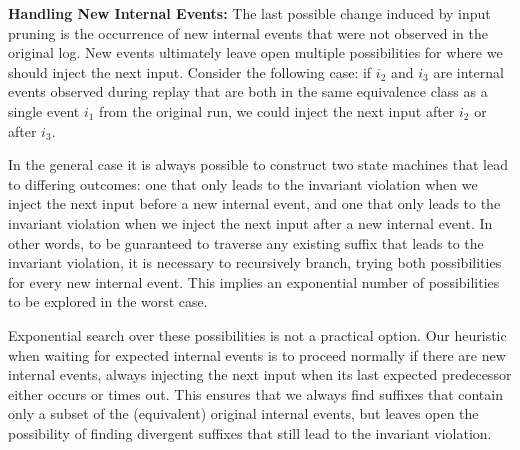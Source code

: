 {\bf Handling New Internal Events:}
The last possible change induced by input pruning is the occurrence of new
internal events that were not observed in the original log.
New events ultimately leave open multiple possibilities for where
we should inject the next input. Consider the following case:
if $i_2$ and $i_3$ are internal events observed
during replay that are both in the same equivalence class as a single event $i_1$ from the
original run, we could inject the next input after $i_2$ or after $i_3$.


In the general case it is always possible to construct two state machines that lead
to differing outcomes: one that only leads to the invariant violation when
we inject the next input
before a new internal event, and one that only leads to the
invariant violation when we inject the next input after a new internal
event. In other words, to be guaranteed to traverse any existing suffix that leads
to the invariant violation, it is necessary to recursively branch, trying both
possibilities for every new internal event. This implies an exponential number of
possibilities to be explored in the worst case.

Exponential search over these possibilities is not a practical option. Our heuristic when waiting for expected internal
events is to proceed normally if there are new internal events,
always injecting the next input when its last expected predecessor
either occurs or times out. This ensures that we always find suffixes that
contain only a subset of the (equivalent) original internal events, but leaves open the
possibility of finding divergent suffixes that still lead to the invariant
violation.


